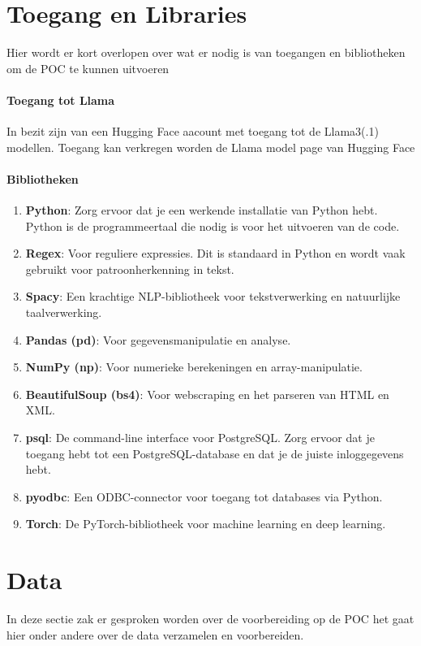 \section{Toegang en Libraries}
Hier wordt er kort overlopen over wat er nodig is van toegangen en bibliotheken om de POC te kunnen uitvoeren
\paragraph{Toegang tot Llama}
 In bezit zijn van een Hugging Face aacount met toegang tot de Llama3(.1) modellen. Toegang kan verkregen worden de Llama model page van Hugging Face
\paragraph{Bibliotheken}
\begin{enumerate}
    \item \textbf{Python}: Zorg ervoor dat je een werkende installatie van Python hebt. Python is de programmeertaal die nodig is voor het uitvoeren van de code.
    \item \textbf{Regex}: Voor reguliere expressies. Dit is standaard in Python en wordt vaak gebruikt voor patroonherkenning in tekst.
    \item \textbf{Spacy}: Een krachtige NLP-bibliotheek voor tekstverwerking en natuurlijke taalverwerking.
    \item \textbf{Pandas (pd)}: Voor gegevensmanipulatie en analyse.
    \item \textbf{NumPy (np)}: Voor numerieke berekeningen en array-manipulatie.
    \item \textbf{BeautifulSoup (bs4)}: Voor webscraping en het parseren van HTML en XML.
    \item \textbf{psql}: De command-line interface voor PostgreSQL. Zorg ervoor dat je toegang hebt tot een PostgreSQL-database en dat je de juiste inloggegevens hebt.
    \item \textbf{pyodbc}: Een ODBC-connector voor toegang tot databases via Python.
    \item \textbf{Torch}: De PyTorch-bibliotheek voor machine learning en deep learning.
\end{enumerate}


\section{Data}
\label{sec:Data}
In deze sectie zak er gesproken worden over de voorbereiding op de POC het gaat hier onder andere over de data verzamelen en voorbereiden.

